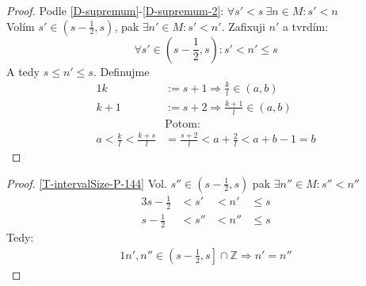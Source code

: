 \begin{proof}
	Podle \autoref*{D-supremum}-\autoref{D-supremum-2}: $\forall s'<s~\exists n\in M:s'<n$ \\
	Volím $s'\in\left(s-\frac{1}{2},s\right)$, pak $\exists n'\in M: s'<n'$. Zafixuji $n'$ a tvrdím:
	\begin{equation}\label{T-intervalSize-P-144}
		\forall s'\in (s-\frac{1}{2},s): s'<n'\leq s
	\end{equation}
	A tedy $s\leq n'\leq s$. Definujme
	\begin{alignat}{1}
		k&:=s+1 \Rightarrow \frac{k}{l}\in (a,b) \\
		k+1&:=s+2 \Rightarrow \frac{k+1}{l}\in (a,b) \\
		&\text{Potom:} \nonumber\\
		a<\frac{k}{l}<\frac{k+s}{l}&=\frac{s+2}{l}<a+\frac{2}{l}<a+b-1=b  %
	\end{alignat}
\end{proof}

\begin{proof}
	\autoref{T-intervalSize-P-144} Vol. $s''\in (s-\frac{1}{2},s)$ pak $\exists n''\in M: s''<n''$
	\begin{alignat}{3}
		s-\frac{1}{2}&<s'&<n'&\leq s \\
		s-\frac{1}{2}&<s''&<n''&\leq s
	\end{alignat}
	Tedy:
	\begin{alignat}{1}
		n',n'' \in \left(s-\frac{1}{2},s\right]\cap\mathbb{Z}\Rightarrow n'=n''
	\end{alignat}
\end{proof}
